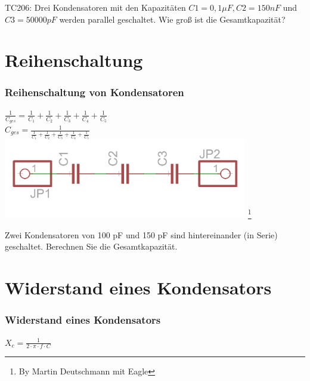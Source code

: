 \begin{frame}
	\begin{center}
			\huge{TC206: Drei Kondensatoren mit den Kapazitäten $C1 = 0,1 \mu F, C2 = 150 nF$ und $C3 = 50000 pF$ werden parallel geschaltet. Wie groß ist die Gesamtkapazität?}
	\end{center}
\end{frame}

\section*{Reihenschaltung}

\begin{frame}
    \frametitle{Reihenschaltung von Kondensatoren}
    \begin{center}
		\huge{$\frac{1}{C_{ges}} = \frac{1}{ C_{1}} + \frac{1}{C_{2}} + \frac{1}{C_{3}} + \frac{1}{C_{4}} + \frac{1}{C_{5}}$}\\
		\vspace{1cm}
		\huge{$C_{ges} = \frac{1}{\frac{1}{ C_1} + \frac{1}{C_2} + \frac{1}{C_3} + \frac{1}{C_4} + \frac{1}{C_5}}$}\\
		\vspace{1cm}	
        \includegraphics[width=0.8\textwidth]{e05/c-reihe.png}
        \footnote{\tiny By Martin Deutschmann mit Eagle}
    \end{center}
	
    
\end{frame}
\begin{frame}
	\begin{center}
		\huge{Zwei Kondensatoren von 100 pF und 150 pF sind hintereinander (in Serie) geschaltet. Berechnen Sie die Gesamtkapazität.}
	\end{center}
\end{frame}

\section*{Widerstand eines Kondensators}
\begin{frame}
    \frametitle{Widerstand eines Kondensators}
	
	\begin{center}
     \huge{$X_c = \frac{1}{2 \cdot \pi \cdot f \cdot C}$}
    \end{center}

\end{frame}

